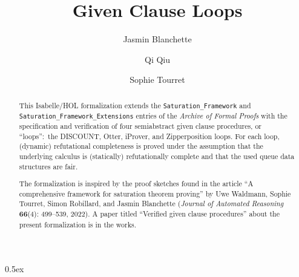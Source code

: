 \documentclass[11pt,a4paper]{article}
\begin{document}
\title{Given Clause Loops}
\author{Jasmin Blanchette \and Qi Qiu \and Sophie Tourret}
\maketitle

\begin{abstract}
\noindent
This Isabelle/HOL formalization extends the
\verb|Saturation_|\allowbreak\verb|Framework| and
\verb|Saturation_|\allowbreak\verb|Framework_|\allowbreak\verb|Extensions|
entries of the \emph{Archive of Formal Proofs} with the specification and
verification of four semiabstract given clause procedures, or ``loops'':\ the
DISCOUNT, Otter, iProver, and Zipperposition loops. For each loop, (dynamic)
refutational completeness is proved under the assumption that the underlying
calculus is (statically) refutationally complete and that the used queue data
structures are fair.

The formalization is inspired by the proof sketches found in the article ``A
comprehensive framework for saturation theorem proving'' by Uwe Waldmann, Sophie
Tourret, Simon Robillard, and Jasmin Blanchette (\emph{Journal of Automated
Reasoning} \textbf{66}(4): 499--539, 2022). A paper titled ``Verified given
clause procedures'' about the present formalization is in the works.
\end{abstract}

\tableofcontents

\parindent 0pt\parskip 0.5ex



%
%
\end{document}
